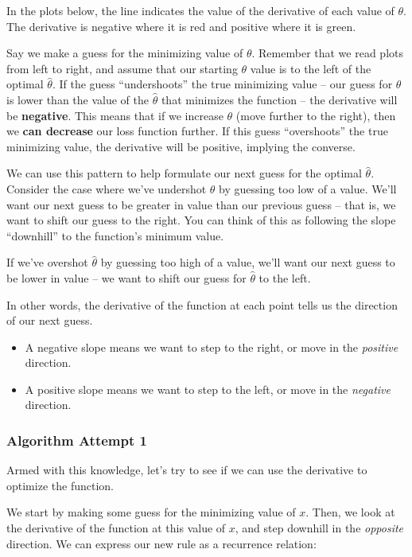 \documentclass[
  letterpaper,
  DIV=11,
  numbers=noendperiod]{scrreprt}
\providecommand{\tightlist}{%
  \setlength{\itemsep}{0pt}\setlength{\parskip}{0pt}}\usepackage{longtable,booktabs,array}
\begin{document}
In the plots below, the line indicates the value of the derivative of
each value of \(\theta\). The derivative is negative where it is red and
positive where it is green.

Say we make a guess for the minimizing value of \(\theta\). Remember
that we read plots from left to right, and assume that our starting
\(\theta\) value is to the left of the optimal \(\hat{\theta}\). If the
guess ``undershoots'' the true minimizing value -- our guess for
\(\theta\) is lower than the value of the \(\hat{\theta}\) that
minimizes the function -- the derivative will be \textbf{negative}. This
means that if we increase \(\theta\) (move further to the right), then
we \textbf{can decrease} our loss function further. If this guess
``overshoots'' the true minimizing value, the derivative will be
positive, implying the converse.

We can use this pattern to help formulate our next guess for the optimal
\(\hat{\theta}\). Consider the case where we've undershot \(\theta\) by
guessing too low of a value. We'll want our next guess to be greater in
value than our previous guess -- that is, we want to shift our guess to
the right. You can think of this as following the slope ``downhill'' to
the function's minimum value.

If we've overshot \(\hat{\theta}\) by guessing too high of a value,
we'll want our next guess to be lower in value -- we want to shift our
guess for \(\hat{\theta}\) to the left.

In other words, the derivative of the function at each point tells us
the direction of our next guess.

\begin{itemize}
\tightlist
\item
  A negative slope means we want to step to the right, or move in the
  \emph{positive} direction.
\item
  A positive slope means we want to step to the left, or move in the
  \emph{negative} direction.
\end{itemize}

\subsubsection{Algorithm Attempt 1}\label{algorithm-attempt-1}

Armed with this knowledge, let's try to see if we can use the derivative
to optimize the function.

We start by making some guess for the minimizing value of \(x\). Then,
we look at the derivative of the function at this value of \(x\), and
step downhill in the \emph{opposite} direction. We can express our new
rule as a recurrence relation:
\end{document}
